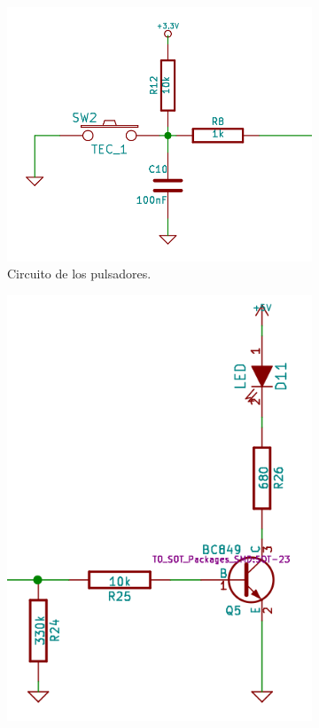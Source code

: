 \begin{figure}[!hp]
  \begin{subfigure}{0.4\textwidth}
    \centering
    \includegraphics[width=1\linewidth]{./Figures/pulse_sch.png}
    \caption{Circuito de los pulsadores.}
  \end{subfigure}%
  \hfill
  \begin{subfigure}{0.4\textwidth}
    \centering
    \includegraphics[width=1\linewidth]{./Figures/led_sch.png}

\end{subfigure}
\end{figure}
